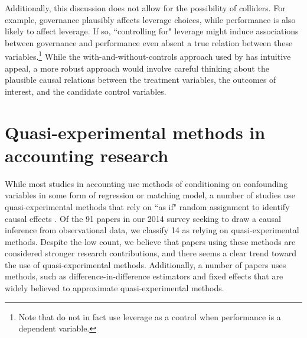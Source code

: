 \documentclass[12pt,reqno,titlepage]{amsart}
\begin{document}
\begin{doublespace}
Additionally, this discussion does not allow for the possibility of colliders.
For example, governance plausibly affects leverage choices, while performance is also likely to affect leverage.
If so, ``controlling for" leverage might induce associations between governance and performance even absent a true relation between these variables.\footnote{
Note that \citet{Larcker:2007aa} do not in fact use leverage as a control when performance is a dependent variable.}
While the with-and-without-controls approach used by \citet{Larcker:2007aa} has intuitive appeal, a more robust approach would involve careful thinking about the plausible causal relations between the treatment variables, the outcomes of interest, and the candidate control variables.

\section{Quasi-experimental methods in accounting research} \label{sec:quasi}
While most studies in accounting use methods of conditioning on confounding variables in some form of regression or matching model, a number of studies use quasi-experimental methods that rely on ``as if" random assignment to identify causal effects \citep{Dunning:2012tt}.
Of the 91 papers in our 2014 survey seeking to draw a causal inference from observational data, we classify 14 as relying on quasi-experimental methods.
Despite the low count, we believe that papers using these methods are considered stronger research contributions, and there seems a clear trend toward the use of quasi-experimental methods.
Additionally, a number of papers uses methods, such as difference-in-difference estimators and fixed effects that are widely believed to approximate quasi-experimental methods.


\end{doublespace}
\end{document}
